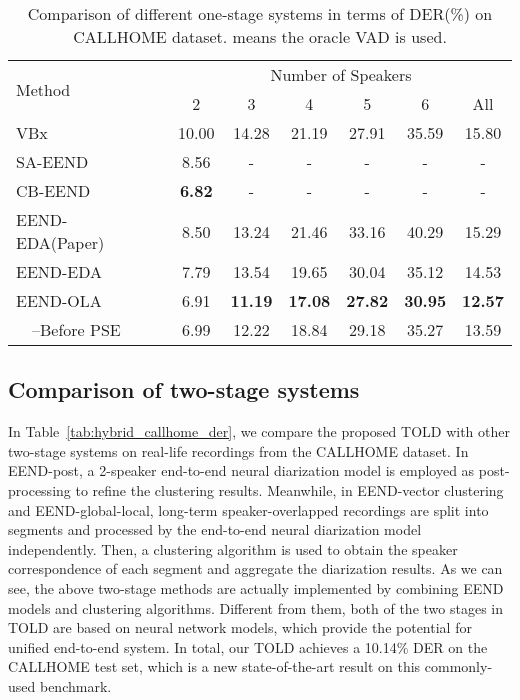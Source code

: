 \documentclass{article}
\begin{document}
\begin{table}[t!]
  \caption{Comparison of different one-stage systems in terms of DER(\%) on CALLHOME dataset.  means the oracle VAD is used.}
  \vspace{0.1cm}
  \label{tab:single_callhome_der}
  \centering
  \setlength\tabcolsep{2.5pt}
  \begin{tabular}{l c c c c c c}
    \toprule 
    \multirow{2}{*}{Method} & \multicolumn{6}{c}{Number of Speakers}  \\
    \cmidrule(lr){2-7}
    & 2  & 3 & 4 & 5 & 6 & All \\
    \midrule
    VBx\cite{vbx}                   & 10.00   & 14.28   & 21.19 & 27.91 & 35.59 & 15.80    \\
    SA-EEND~\cite{SA_EEND}                         & 8.56    & -   & -	& -	& -	& -    \\
    CB-EEND~\cite{CB_EEND}                         & \textbf{6.82}    & -   & -	& -	& -	& -    \\
    EEND-EDA(Paper)~\cite{EEND_EDA}        & 8.50    & 13.24   & 21.46 & 33.16 & 40.29 & 15.29    \\
    EEND-EDA                & 7.79    & 13.54   & 19.65	& 30.04	& 35.12	& 14.53    \\
    \midrule
    EEND-OLA     & 6.91	    & \textbf{11.19}	& \textbf{17.08}	& \textbf{27.82}	& \textbf{30.95}	& \textbf{12.57}    \\
    ~~--Before PSE    & 6.99	    & 12.22	& 18.84	& 29.18	& 35.27	& 13.59    \\
    \bottomrule
  \end{tabular}
\end{table}

\subsection{Comparison of two-stage systems}
In Table~\ref{tab:hybrid_callhome_der}, we compare the proposed TOLD with other two-stage systems on real-life recordings from the CALLHOME dataset. In EEND-post, a 2-speaker end-to-end neural diarization model is employed as post-processing to refine the clustering results. Meanwhile, in EEND-vector clustering and EEND-global-local, long-term speaker-overlapped recordings are split into segments and processed by the end-to-end neural diarization model independently. Then, a clustering algorithm is used to obtain the speaker correspondence of each segment and aggregate the diarization results.
As we can see, the above two-stage methods are actually implemented by combining EEND models and clustering algorithms. Different from them, both of the two stages in TOLD are based on neural network models, which provide the potential for unified end-to-end system.
In total, our TOLD achieves a 10.14\% DER on the CALLHOME test set, which is a new state-of-the-art result on this commonly-used benchmark.
\end{document}

